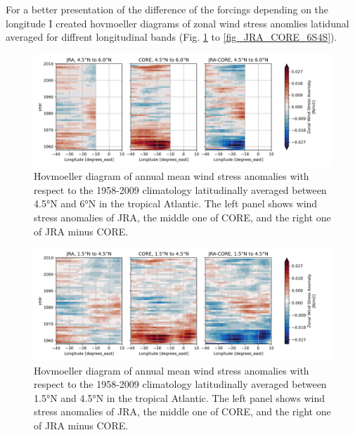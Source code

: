 \documentclass[a4paperpaper,]{article}
\begin{document}
For a better presentation of the difference of the forcings depending on
the longitude I created hovmoeller diagrams of zonal wind stress
anomlies latidunal averaged for diffrent longitudinal bands (Fig.
\ref{fig_JRA_CORE_4N6N} to \ref{fig_JRA_CORE_6S4S}).

\begin{figure}
\centering
\includegraphics{./figures/INALT20_wind_forcing_comparison/INALT_JRA_CORE_taux_anomaly_hovm_4p5n6p0n_40w10e.png}
\caption{Hovmoeller diagram of annual mean wind stress anomalies with
respect to the 1958-2009 climatology latitudinally averaged between
4.5°N and 6°N in the tropical Atlantic. The left panel shows wind stress
anomalies of JRA, the middle one of CORE, and the right one of JRA minus
CORE. \label{fig_JRA_CORE_4N6N}}
\end{figure}

\begin{figure}
\centering
\includegraphics{./figures/INALT20_wind_forcing_comparison/INALT_JRA_CORE_taux_anomaly_hovm_1p5n4p5n_40w10e.png}
\caption{Hovmoeller diagram of annual mean wind stress anomalies with
respect to the 1958-2009 climatology latitudinally averaged between
1.5°N and 4.5°N in the tropical Atlantic. The left panel shows wind
stress anomalies of JRA, the middle one of CORE, and the right one of
JRA minus CORE. \label{fig_JRA_CORE_1N4N}}
\end{figure}
\end{document}
